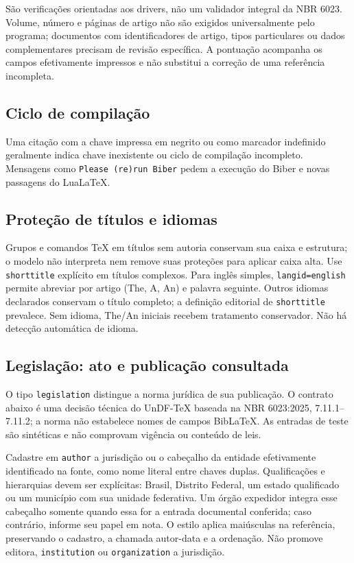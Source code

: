 São verificações orientadas aos drivers, não um validador integral da
NBR 6023. Volume, número e páginas de artigo não são exigidos
universalmente pelo programa; documentos com identificadores de artigo,
tipos particulares ou dados complementares precisam de revisão específica.
A pontuação acompanha os campos efetivamente impressos e não substitui
a correção de uma referência incompleta.

\subsection*{Ciclo de compilação}

Uma citação com a chave impressa em negrito ou como marcador indefinido geralmente indica chave inexistente ou ciclo de compilação incompleto. Mensagens como \texttt{Please (re)run Biber} pedem a execução do Biber e novas passagens do LuaLaTeX.

\subsection*{Proteção de títulos e idiomas}
Grupos e comandos TeX em títulos sem autoria conservam sua caixa e estrutura;
o modelo não interpreta nem remove suas proteções para aplicar caixa alta.
Use \texttt{shorttitle} explícito em títulos complexos. Para inglês simples,
\texttt{langid=english} permite abreviar por artigo (The, A, An) e palavra
seguinte. Outros idiomas declarados conservam o título completo; a definição
editorial de \texttt{shorttitle} prevalece. Sem idioma, The/An iniciais
recebem tratamento conservador. Não há detecção automática de idioma.


\subsection*{Legislação: ato e publicação consultada}

O tipo \texttt{legislation} distingue a norma jurídica de sua publicação.
O contrato abaixo é uma decisão técnica do UnDF-TeX baseada na NBR 6023:2025,
7.11.1--7.11.2; a norma não estabelece nomes de campos BibLaTeX.
As entradas de teste são sintéticas e não comprovam vigência ou conteúdo de leis.

Cadastre em \texttt{author} a jurisdição ou o cabeçalho da entidade efetivamente
identificado na fonte, como nome literal entre chaves duplas. Qualificações e
hierarquias devem ser explícitas: Brasil, Distrito Federal, um estado qualificado
ou um município com sua unidade federativa. Um órgão expedidor integra esse
cabeçalho somente quando essa for a entrada documental conferida; caso contrário,
informe seu papel em nota. O estilo aplica maiúsculas na referência, preservando
o cadastro, a chamada autor-data e a ordenação. Não promove editora,
\texttt{institution} ou \texttt{organization} a jurisdição.

